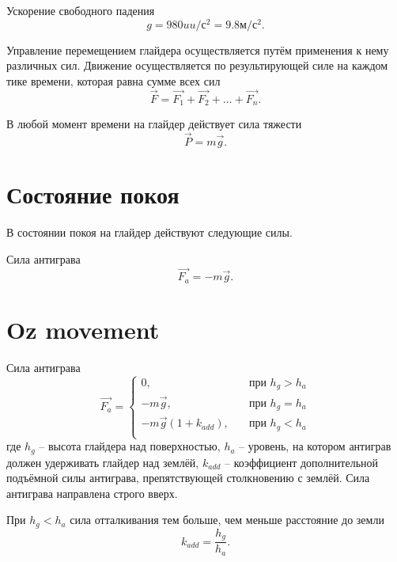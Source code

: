 \documentclass[a4paper,12pt]{report}
\begin{document}
Ускорение свободного падения
\begin{equation}
g = 980uu/с^2 = 9.8м/с^2.
\end{equation}

Управление перемещением глайдера осуществляется путём применения к нему различных сил. Движение осуществляется по результирующей силе на каждом тике времени, которая равна сумме всех сил
\begin{equation}
\vec{F} = \vec{F_1} + \vec{F_2} + \dots + \vec{F_n}.
\end{equation}

В любой момент времени на глайдер действует сила тяжести
\begin{equation}
\vec{P} = m\vec{g}.
\end{equation}

\section{Состояние покоя}

В состоянии покоя на глайдер действуют следующие силы.

Сила антиграва
\begin{equation}
\vec{F_a} =
-m\vec{g}.
\end{equation}

\section{Oz movement}

Сила антиграва
\begin{equation}
\label{antigrav_force}
\vec{F_a} =
\begin{cases}
0, & \quad \text{при } h_{g} > h_a \\
-m\vec{g}, & \quad \text{при } h_{g} = h_a \\
-m\vec{g}(1+ k_{add}), & \quad \text{при } h_{g} < h_a \\
\end{cases}
\end{equation}
где $h_{g}$ -- высота глайдера над поверхностью, $h_a$ -- уровень, на котором антиграв должен удерживать глайдер над землёй, $k_{add}$ -- коэффициент дополнительной подъёмной силы антиграва, препятствующей столкновению с землёй.
Сила антиграва направлена строго вверх.

При $h_g < h_a$ сила отталкивания тем больше, чем меньше расстояние до земли
\begin{equation}
k_{add} =\frac{h_{g}}{h_{a}}.
\end{equation}
\end{document}

